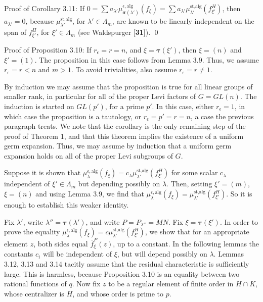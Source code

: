 \pproclaim Proof of Corollary 3.11:
If
  $ 0 = 
    \sum
    a_{\lambda'}
    \mu_{\pmb\sigma(\lambda')}^{\epsilon,\text{alg}}
    (f_{\xi}) =
    \sum
    a_{\lambda'}
    \mu_{\lambda'}^{\text{st,alg}}
    (f_{\xi'}^H) $,
then
  $ a_{\lambda'} = 0 $,
because 
  $ \mu_{\lambda'}^{\text{st,alg}} $,
  for $ \lambda' \in \Lambda_m $,
are known to be linearly independent on the span of
  $ f_{\xi'}^H $, for
  $ \xi' \in \Lambda_m $
(see Waldspurger [{\bf 31}]).
\qed\finishpproclaim

\pproclaim Proof of Proposition 3.10:
If
  $ r_{\epsilon} = r = n $, and 
  $ \xi = \pmb\tau (\xi') $, then
  $ \xi = (n) $
and
  $ \xi' = (1) $.
The proposition in this case follows from
Lemma 3.9.
Thus, we assume 
  $ r_{\epsilon} = r < n $ and 
  $ m > 1 $.
To avoid trivialities, also assume
  $ r_{\epsilon} = r \neq 1 $.

By induction we may assume that the proposition is true for
  all linear groups of smaller rank, in particular for all of
  the proper Levi factors of 
  $ G = GL (n) $.
The induction is started on 
  $ GL(p') $, for 
a prime $p'$.  In this case, either
  $ r_{\epsilon} = 1 $,
in which case the proposition is a tautology, or
  $ r_{\epsilon} = p' = r = n $,
a case the previous paragraph treats.
We note that the corollary is the only remaining step of the
  proof of Theorem 1, and that this theorem implies the existence
  of a uniform germ expansion. 
Thus, we may assume by induction that a uniform germ expansion holds
  on all of the proper Levi subgroups of
  $G$.

Suppose it is shown that
  $ \mu_{\lambda}^{\epsilon,\text{alg}} (f_{\xi}) =
    \text{c}_{\lambda}
    \mu_{\lambda'}^{\text{st,alg}}
    (f_{\xi'}^H) $
for some scalar 
  $ \text{c}_{\lambda} $
independent of
  $ \xi' \in \Lambda_m $ but depending
  possibly on $\lambda$.
Then, setting
  $ \xi'= (m) $,
  $ \xi = (n) $
and using Lemma 3.9, we find that
  $ \mu_{\lambda}^{\epsilon,\text{alg}}
    (f_{\xi}) = 
    \mu_{\lambda'}^{\text{st,alg}} 
    (f_{\xi'}^H) $.
So it is enough to establish this weaker identity.

Fix $\lambda'$, write $\lambda''=\pmb\tau(\lambda')$, and
write $P=P_{\lambda''}=MN$.  Fix $\xi=\pmb\tau(\xi')$.  In order to
prove the equality $\mu_\lambda^{\epsilon,\text{alg}}(f_\xi) = c
\mu^{\text{st,alg}}_{\lambda'}(f^H_{\xi'})$, we show that for an
appropriate element $z$, both
sides equal $\bar f^P_\xi(z)$, up to a constant.
In the following
lemmas the constants $c_i$ will be independent of $\xi$, but
will depend possibly on $\lambda$.  Lemmas 3.12, 3.13 and 3.14 tacitly assume
that the residual characteristic is sufficiently large.  
This is harmless, because Proposition 3.10 is an equality between
two rational functions of $q$.  Now
fix $z$ to be a regular element of finite order in $H\cap K$, 
whose centralizer is $H$,
and whose order is prime to $p$.

